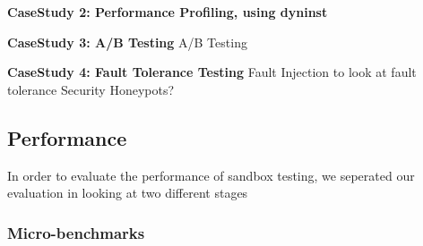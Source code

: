 \par \noindent \textbf{CaseStudy 2: Performance Profiling, using dyninst}

\par \noindent \textbf{CaseStudy 3: A/B Testing}
A/B Testing 

\par \noindent \textbf{CaseStudy 4: Fault Tolerance Testing}
Fault Injection to look at fault tolerance
Security Honeypots? 

\subsection{Performance}
\label{sec:performance}

In order to evaluate the performance of sandbox testing, we seperated our evaluation in looking at two different stages
\subsubsection{Micro-benchmarks}
\label{sec:micro}

